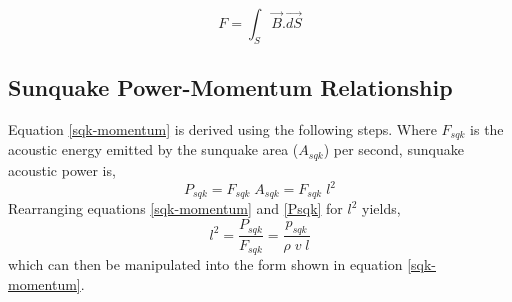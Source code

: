 \begin{equation}\label{fluxtube}       
F = \int_{S} \vec{B}.\vec{dS}
\end{equation}



\subsection{Sunquake Power-Momentum Relationship}\label{sqk-ptoP-relation}
Equation \ref{sqk-momentum} is derived using the following steps. Where $F_{sqk}$ is the acoustic energy emitted by the sunquake area ($A_{sqk}$) per second, sunquake acoustic power is, 
\begin{equation}
P_{sqk} = F_{sqk} \; A_{sqk} = F_{sqk} \; l^2
\end{equation}\label{Psqk}
Rearranging equations \ref{sqk-momentum} and \ref{Psqk} for $l^{2}$ yields,
\begin{equation}
l^2 = \frac{P_{sqk}}{F_{sqk}} = \frac{p_{sqk}}{\rho \; v \; l} 
\end{equation}\label{l^2}
which can then be manipulated into the form shown in equation \ref{sqk-momentum}. 



